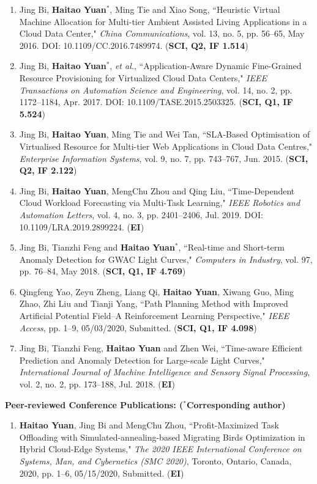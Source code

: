 \documentclass[margin,line]{res}
\begin{document}
\begin{resume}
\begin{enumerate}
\item Jing Bi, \textbf{Haitao Yuan$^{*}$}, Ming Tie and Xiao Song, ``Heuristic Virtual Machine Allocation for Multi-tier Ambient Assisted Living Applications in a Cloud Data Center," \emph{China Communications}, vol. 13, no. 5, pp. 56--65, May 2016. DOI: 10.1109/CC.2016.7489974. (\textbf{SCI, Q2, IF 1.514})
\item Jing Bi, \textbf{Haitao Yuan$^{*}$}, \textit{et al.}, ``Application-Aware Dynamic Fine-Grained Resource Provisioning for Virtualized Cloud Data Centers," \emph{IEEE Transactions on Automation Science and Engineering}, vol. 14, no. 2, pp. 1172--1184, Apr. 2017. DOI: 10.1109/TASE.2015.2503325. (\textbf{SCI, Q1, IF 5.524})
\item Jing Bi, \textbf{Haitao Yuan}, Ming Tie and Wei Tan, ``SLA-Based Optimisation of Virtualised Resource for Multi-tier Web Applications in Cloud Data Centres," \emph{Enterprise Information Systems}, vol. 9, no. 7, pp. 743--767, Jun. 2015. (\textbf{SCI, Q2, IF 2.122})
\item Jing Bi, \textbf{Haitao Yuan}, MengChu Zhou and Qing Liu, ``Time-Dependent Cloud Workload Forecasting via Multi-Task Learning," \emph{IEEE Robotics and Automation Letters}, vol. 4, no. 3, pp. 2401--2406, Jul. 2019. DOI: 10.1109/LRA.2019.2899224. (\textbf{EI})
\item Jing Bi, Tianzhi Feng and \textbf{Haitao Yuan$^{*}$}, ``Real-time and Short-term Anomaly Detection for GWAC Light Curves," \emph{Computers in Industry}, vol. 97, pp. 76--84, May 2018. (\textbf{SCI, Q1, IF 4.769})
\item Qingfeng Yao, Zeyu Zheng, Liang Qi, \textbf{Haitao Yuan}, Xiwang Guo, Ming Zhao, Zhi Liu and Tianji Yang, ``Path Planning Method with Improved Artificial Potential Field--A Reinforcement Learning Perspective," \emph{IEEE Access}, pp. 1--9, 05/03/2020, Submitted. (\textbf{SCI, Q1, IF 4.098})
\item Jing Bi, Tianzhi Feng, \textbf{Haitao Yuan} and Zhen Wei, ``Time-aware Efficient Prediction and Anomaly Detection for Large-scale Light Curves," \emph{International Journal of Machine Intelligence and Sensory Signal Processing}, vol. 2, no. 2, pp. 173--188, Jul. 2018. (\textbf{EI})
\end{enumerate}
{\bf {Peer-reviewed Conference Publications: ($^{*}$Corresponding author)}}
\begin{enumerate}
\item \textbf{Haitao Yuan}, Jing Bi and MengChu Zhou, ``Profit-Maximized Task Offloading with Simulated-annealing-based Migrating Birds Optimization in Hybrid Cloud-Edge Systems," \emph{The 2020 IEEE International Conference on Systems, Man, and Cybernetics (SMC 2020)}, Toronto, Ontario, Canada, 2020, pp. 1--6, 05/15/2020, Submitted. (\textbf{EI})

\end{enumerate}
\end{resume}
\end{document}
